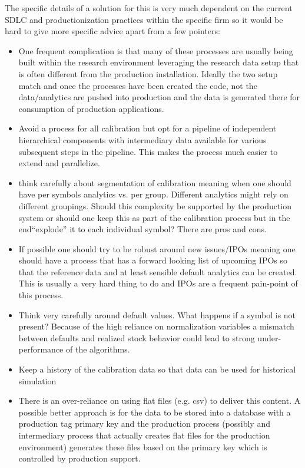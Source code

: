 The specific details of a solution for this is very much dependent on the current SDLC and productionization practices within the specific firm so it would be hard to give more specific advice apart from a few pointers:
\begin{itemize}
\item One frequent complication is that many of these processes are usually being built within the research environment leveraging the research data setup that is often different from the production installation. Ideally the two setup match and once the processes have been created the code, not the data/analytics are pushed into production and the data is generated there for consumption of production applications.
\item Avoid a  process for all calibration but opt for a pipeline of independent hierarchical components with intermediary data available for various subsequent steps in the pipeline. This makes the process much easier to extend and parallelize. 
\item think carefully about segmentation of calibration meaning when one should have per symbols analytics vs. per group. Different analytics might rely on different groupings. Should this complexity be supported by the production system or should one keep this as part of the calibration process but in the end``explode'' it to each individual symbol? There are pros and cons.
\item If possible one should try to be robust around new issues/IPOs meaning one should have a process that has a forward looking list of upcoming IPOs so that the reference data and at least sensible default analytics can be created. This is usually a very hard thing to do and IPOs are a frequent pain-point of this process.
\item Think very carefully around default values. What happens if a symbol is not present? Because of the high reliance on normalization variables a mismatch between defaults and realized stock behavior could lead to strong under-performance of the algorithms.
\item Keep a history of the calibration data so that data can be used for historical simulation
\item There is an over-reliance on using flat files (e.g. csv) to deliver this content. A possible better approach is for the data to be stored into a database with a production tag primary key and the production process (possibly and intermediary process that actually creates flat files for the production environment) generates these files based on the primary key which is controlled by production support. 
\end{itemize}




